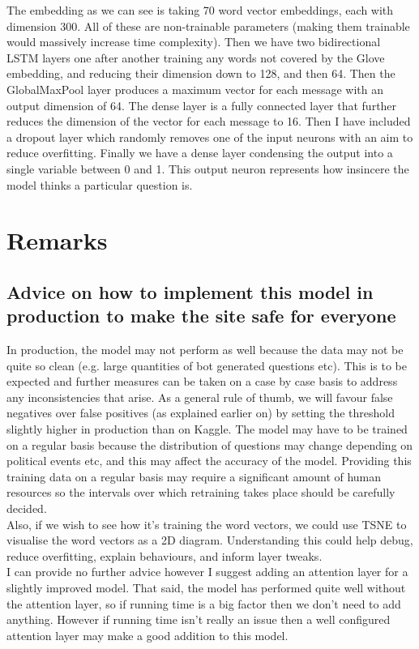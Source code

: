 \documentclass{article}
\begin{document}
The embedding as we can see is taking 70 word vector embeddings, each with dimension 300. All of these are non-trainable parameters (making them trainable would massively increase time complexity). Then we have two bidirectional LSTM layers one after another training any words not covered by the Glove embedding, and reducing their dimension down to 128, and then 64. Then the GlobalMaxPool layer produces a maximum vector for each message with an output dimension of 64. The dense layer is a fully connected layer that further reduces the dimension of the vector for each message to 16. Then I have included a dropout layer which randomly removes one of the input neurons with an aim to reduce overfitting. Finally we have a dense layer condensing the output into a single variable between 0 and 1. This output neuron represents how insincere the model thinks a particular question is.

\section{Remarks}
\subsection{Advice on how to implement this model in production to make the site safe for everyone}

In production, the model may not perform as well because the data may not be quite so clean (e.g. large quantities of bot generated questions etc). This is to be expected and further measures can be taken on a case by case basis to address any inconsistencies that arise. As a general rule of thumb, we will favour false negatives over false positives (as explained earlier on) by setting the threshold slightly higher in production than on Kaggle. The model may have to be trained on a regular basis because the distribution of questions may change depending on political events etc, and this may affect the accuracy of the model. Providing this training data on a regular basis may require a significant amount of human resources so the intervals over which retraining takes place should be carefully decided.\\

Also, if we wish to see how it's training the word vectors, we could use TSNE to visualise the word vectors as a 2D diagram. Understanding this could help debug, reduce overfitting, explain behaviours, and inform layer tweaks.\\

I can provide no further advice however I suggest adding an attention layer for a slightly improved model. That said, the model has performed quite well without the attention layer, so if running time is a big factor then we don't need to add anything. However if running time isn't really an issue then a well configured attention layer may make a good addition to this model.
\end{document}
